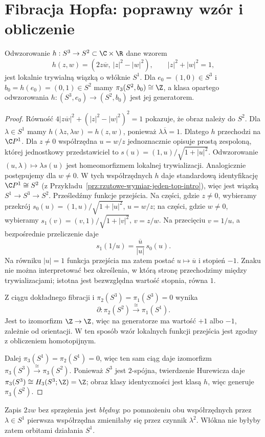 \section{Fibracja Hopfa: poprawny wzór i obliczenie}
\begin{twierdzenie}
\label{thm:hopf-v4}
Odwzorowanie
$h:S^3\to S^2\subset\C\times\R$ dane wzorem
\[
h(z,w)=(2z\overline w,\ |z|^2-|w|^2),\qquad
|z|^2+|w|^2=1,
\]
jest lokalnie trywialną wiązką o włóknie $S^1$.
Dla $e_0=(1,0)\in S^3$ i $b_0=h(e_0)=(0,1)\in S^2$
mamy $\pi_3(S^2,b_0)\cong\Z$, a klasa opartego odwzorowania
$h:(S^3,e_0)\to(S^2,b_0)$ jest jej generatorem.
\end{twierdzenie}
\begin{proof}
Równość $4|z\overline w|^2+(|z|^2-|w|^2)^2=1$
pokazuje, że obraz należy do $S^2$.
Dla $\lambda\in S^1$ mamy
$h(\lambda z,\lambda w)=h(z,w)$, ponieważ
$\lambda\overline\lambda=1$.
Dlatego $h$ przechodzi na $\C P^1$.
Dla $z\ne0$ współrzędna $u=w/z$ jednoznacznie opisuje
prostą zespoloną, której jednostkowy przedstawiciel to
$s(u)=(1,u)/\sqrt{1+|u|^2}$. Odwzorowanie
$(u,\lambda)\mapsto\lambda s(u)$ jest homeomorfizmem
lokalnej trywializacji. Analogicznie postępujemy dla $w\ne0$.
W tych współrzędnych $h$ daje standardową identyfikację
$\C P^1\cong S^2$
(z Przykładu~\ref{prz:rzutowe-wymiar-jeden-top-intro}),
więc jest wiązką $S^1\to S^3\to S^2$.
Prześledźmy funkcje przejścia.
Na części, gdzie $z\ne0$, wybieramy przekrój
$s_0(u)=(1,u)/\sqrt{1+|u|^2}$, $u=w/z$;
na części, gdzie $w\ne0$, wybieramy
$s_1(v)=(v,1)/\sqrt{1+|v|^2}$, $v=z/w$.
Na przecięciu $v=1/u$, a bezpośrednie przeliczenie daje
\[
 s_1(1/u)=\frac{\overline u}{|u|}\,s_0(u).
\]
Na równiku $|u|=1$ funkcja przejścia ma zatem
postać $u\mapsto\overline u$ i stopień $-1$.
Znaku nie można interpretować bez określenia,
w którą stronę przechodzimy między trywializacjami;
istotna jest bezwzględna wartość stopnia, równa $1$.

Z ciągu dokładnego fibracji i
$\pi_2(S^3)=\pi_1(S^3)=0$ wynika
\[
 \partial:\pi_2(S^2)\xrightarrow{\ \cong\ }\pi_1(S^1).
\]
Jest to izomorfizm $\Z\to\Z$, więc na generatorze
ma wartość $+1$ albo $-1$, zależnie od orientacji.
W ten sposób wzór lokalnych funkcji przejścia
jest zgodny z obliczeniem homotopijnym.

Dalej $\pi_3(S^1)=\pi_2(S^1)=0$, więc ten sam
ciąg daje izomorfizm
$\pi_3(S^3)\xrightarrow{\cong}\pi_3(S^2)$.
Ponieważ $S^3$ jest $2$-spójna, twierdzenie Hurewicza daje
$\pi_3(S^3)\cong H_3(S^3;\Z)=\Z$; obraz klasy identyczności
jest klasą $h$, więc generuje $\pi_3(S^2)$.
\end{proof}
\begin{uwaga}
Zapis $2zw$ bez sprzężenia jest \emph{błędny}:
po pomnożeniu obu współrzędnych przez $\lambda\in S^1$
pierwsza współrzędna zmieniłaby się przez czynnik $\lambda^2$.
Włókna nie byłyby zatem orbitami działania $S^1$.
\end{uwaga}

